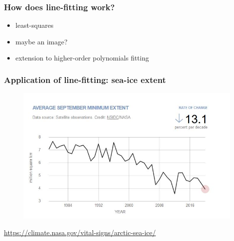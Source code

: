 \documentclass[english,14pt]{beamer}
\begin{document}

\begin{frame}[fragile]

\frametitle{How does line-fitting work?}

\begin{itemize}
	\item least-squares
	\item maybe an image?
	\item extension to higher-order polynomials fitting
\end{itemize}

\end{frame}


\begin{frame}[fragile]

\frametitle{Application of line-fitting: sea-ice extent}

\vspace*{-5mm}

\begin{figure}[ht]
	\centering
	\includegraphics[width=.9\textwidth]{figures/seaiceextent}
\end{figure}

\href{https://climate.nasa.gov/vital-signs/arctic-sea-ice/}{https://climate.nasa.gov/vital-signs/arctic-sea-ice/}

\end{frame}

\end{document}
